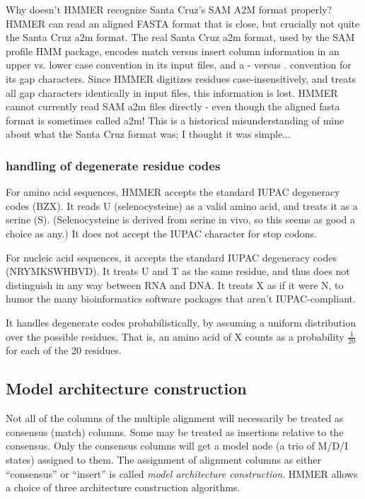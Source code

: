 \begin{srefaq}{Why doesn't HMMER recognize Santa Cruz's SAM A2M format
properly?} HMMER can read an aligned FASTA format that is close, but
crucially not quite the Santa Cruz a2m format.  The real Santa Cruz
a2m format, used by the SAM profile HMM package, encodes match versus
insert column information in an upper vs. lower case convention in its
input files, and a - versus . convention for its gap characters.
Since HMMER digitizes residues case-insensitively, and treats
all gap characters identically in input files, this
information is lost. HMMER cannot currently read SAM a2m files
directly - even though the aligned fasta format is sometimes
called a2m! This is a historical misunderstanding of mine
about what the Santa Cruz format was; I thought it was simple...
\end{srefaq}

\subsubsection{handling of degenerate residue codes}

For amino acid sequences, HMMER accepts the standard IUPAC degeneracy
codes (BZX). It reads U (selenocysteine) as a valid amino acid, and
treats it as a serine (S). (Selenocysteine is derived from serine in
vivo, so this seems as good a choice as any.) It does not accept the
IUPAC \prog{*} character for stop codons.

For nucleic acid sequences, it accepts the standard IUPAC degeneracy
codes (NRYMKSWHBVD). It treats U and T as the same residue, and thus
does not distinguish in any way between RNA and DNA.  It treats X as
if it were N, to humor the many bioinformatics software packages that
aren't IUPAC-compliant.

It handles degenerate codes probabilistically, by assuming a uniform
distribution over the possible residues. That is, an amino acid of X
counts as a probability $\frac{1}{20}$ for each of the 20 residues.


\subsection{Model architecture construction}

Not all of the columns of the multiple alignment will necessarily be
treated as consensus (match) columns. Some may be treated as
insertions relative to the consensus. Only the consensus columns will
get a model node (a trio of M/D/I states) assigned to them.  The
assignment of alignment columns as either ``consensus'' or ``insert''
is called \emph{model architecture construction}. HMMER allows
a choice of three architecture construction algorithms.

